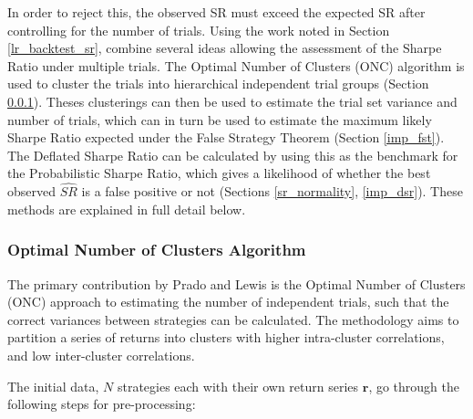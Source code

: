 \documentclass[a4paper,11pt,oneside]{article}
\theoremstyle{plain}
\theoremstyle{definition}
\begin{document}
	In order to reject this, the observed SR must exceed the expected SR after controlling for the number of trials. Using the 
	work noted in Section \ref{lr_backtest_sr}, \citet{PradoDSR} combine several ideas allowing the assessment of the Sharpe Ratio under multiple trials. The Optimal Number of Clusters (ONC) algorithm is used to cluster the trials into hierarchical independent trial groups (Section \ref{imp_onc}). Theses clusterings can then be used to estimate the trial set variance and number of trials, which can in turn be used to estimate the maximum likely Sharpe Ratio expected under the False Strategy Theorem (Section  \ref{imp_fst}). The Deflated Sharpe Ratio can be calculated by using this as the benchmark for the Probabilistic Sharpe Ratio, which gives a likelihood of whether the best observed $\widehat{SR}$ is a false positive or not (Sections \ref{sr_normality}, \ref{imp_dsr}). These methods are explained in full detail below.
	
	\subsubsection{Optimal Number of Clusters Algorithm}\label{imp_onc}
	
	The primary contribution by Prado and Lewis is the Optimal Number of Clusters (ONC) approach to estimating the number of independent trials, such that the correct variances between strategies can be calculated. The methodology aims to partition a series of returns into clusters with higher intra-cluster correlations, and low inter-cluster correlations. \newline
	
	The initial data, $N$ strategies each with their own return series $\mathbf{r}$, go through the following steps for pre-processing:
		
\end{document}
